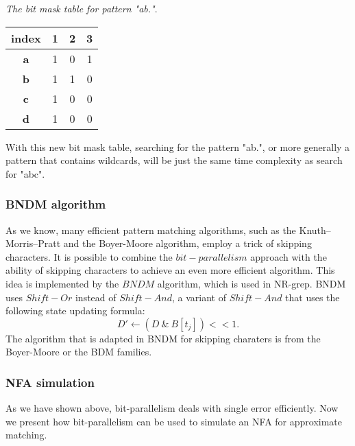 \begin{example}\emph{The bit mask table for pattern "ab."}.
	\begin{table}[H]
		\centering
		\begin{tabular}{|c|c|c|c|}
			\hline
			index      & 1                        & 2                        & 3                        \\ \hline
			\textbf{a} & {\color{red} 1}                   & 0                        & {\color[HTML]{3531FF} 1} \\ \hline
			\textbf{b} &  {\color{red} 1}                    & {\color[HTML]{3531FF} 1} & 0                        \\ \hline
			\textbf{c} & {\color[HTML]{3531FF} 1} & 0                        & 0                        \\ \hline
			\textbf{d} &{\color{red} 1}                    & 0                        & 0                        \\ \hline
		\end{tabular}
		\label{table-bitmask2}
	\end{table}
\end{example}

With this new bit mask table, searching for the pattern "ab.", or more generally a pattern that contains wildcards, will be just the same time complexity as search for "abc". 
 
\subsubsection{BNDM algorithm}
As we know, many efficient pattern matching algorithms, such as the Knuth–Morris–Pratt and the Boyer-Moore algorithm, employ a trick of skipping characters. It is possible to combine the $bit-parallelism$ approach with the ability of skipping characters to achieve an even more efficient algorithm. This idea is implemented by the $BNDM$ algorithm, which is used in NR-grep. BNDM uses $Shift-Or$ instead of $Shift-And$, a variant of $Shift-And$ that uses the following state updating formula:  
$$ D' \leftarrow  (D \ \& \ B[t_j]) << 1 .$$ The algorithm that is adapted in BNDM for skipping charaters is from the Boyer-Moore or the BDM families\cite{crochemore1994text}.


\subsubsection{NFA simulation}
As we have shown above, bit-parallelism deals with single error efficiently.
Now we present how bit-parallelism can be used to simulate an NFA for approximate matching. 

